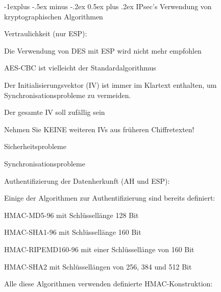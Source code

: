 \documentclass[a4paper]{article}
\makeatletter
\renewcommand{\subsection}{\@startsection{subsection}{2}{0mm}%
 {-1explus -.5ex minus -.2ex}%
 {0.5ex plus .2ex}%
 {\normalfont\normalsize\bfseries}}
\makeatother
\begin{document}
\begin{multicols}{3}
      \subsection{IPsec's Verwendung von kryptographischen Algorithmen}
      \begin{itemize*}
            \item Vertraulichkeit (nur ESP):
            \begin{itemize*}
                  \item Die Verwendung von DES mit ESP wird nicht mehr empfohlen
                  \item AES-CBC ist vielleicht der Standardalgorithmus
                  \item Der Initialisierungsvektor (IV) ist immer im Klartext enthalten, um Synchronisationsprobleme zu vermeiden.
                  \item Der gesamte IV soll zufällig sein
                  \item Nehmen Sie KEINE weiteren IVs aus früheren Chiffretexten!
                  \begin{itemize*}
                        \item Sicherheitsprobleme
                        \item Synchronisationsprobleme
                  \end{itemize*}
            \end{itemize*}
            \item Authentifizierung der Datenherkunft (AH und ESP):
            \begin{itemize*}
                  \item Einige der Algorithmen zur Authentifizierung sind bereits definiert:
                  \begin{itemize*}
                        \item HMAC-MD5-96 mit Schlüssellänge 128 Bit
                        \item HMAC-SHA1-96 mit Schlüssellänge 160 Bit
                        \item HMAC-RIPEMD160-96 mit einer Schlüssellänge von 160 Bit
                        \item HMAC-SHA2 mit Schlüssellängen von 256, 384 und 512 Bit
                  \end{itemize*}
                  \item Alle diese Algorithmen verwenden definierte HMAC-Konstruktion:

\end{itemize*}
\end{itemize*}
\end{multicols}
\end{document}

